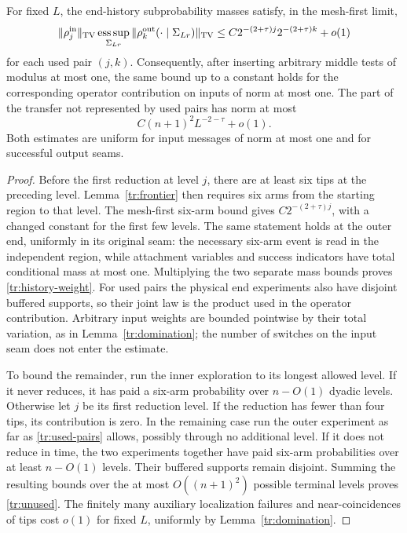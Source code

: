 \begin{lemma}
\label{tr:tails}
For fixed $L$, the end-history subprobability masses satisfy, in the
mesh-first limit,
\begin{equation}
 \|\rho_j^{\rm in}\|_{\mathrm{TV}}
 \operatorname*{ess\,sup}_{\Sigma_{Lr}}
         \|\rho_k^{\rm out}(\cdot\mid\Sigma_{Lr})\|_{\mathrm{TV}}
      \le C 2^{-(2+\tau)j}2^{-(2+\tau)k}+o(1)
\label{tr:history-weight}
\end{equation}
for each used pair $(j,k)$.  Consequently, after inserting arbitrary
middle tests of modulus at most one, the same bound up to a constant holds
for the corresponding operator contribution on inputs of norm at most
one.  The part of the transfer not represented
by used pairs has norm at most
\begin{equation}
             C(n+1)^2L^{-2-\tau}+o(1).
\label{tr:unused}
\end{equation}
Both estimates are uniform for input messages of norm at most one and
for successful output seams.
\end{lemma}

\begin{proof}
Before the first reduction at level $j$, there are at least six tips
at the preceding level.  Lemma~\ref{tr:frontier} then requires six arms
from the starting region to that level.  The mesh-first six-arm bound
gives $C2^{-(2+\tau)j}$, with a changed constant for the first few
levels.  The same statement holds at the outer end, uniformly in its
original seam: the necessary six-arm event is read in the independent
region, while attachment variables and success indicators have total
conditional mass at most one.  Multiplying the two separate mass
bounds proves \eqref{tr:history-weight}.  For used pairs the physical
end experiments also have disjoint buffered supports, so their joint
law is the product used in the operator contribution.  Arbitrary input
weights are bounded
pointwise by their total variation, as in
Lemma~\ref{tr:domination}; the number of switches on the input seam
does not enter the estimate.

To bound the remainder, run the inner exploration to its longest
allowed level.  If it never reduces, it has paid a six-arm probability
over $n-O(1)$ dyadic levels.  Otherwise let $j$ be its first reduction
level.  If the reduction has fewer than four tips, its contribution
is zero.  In the remaining case run the outer experiment as far as
\eqref{tr:used-pairs} allows, possibly through no additional level.
If it does not reduce in time, the two experiments together have
paid six-arm probabilities over at least $n-O(1)$ levels.  Their
buffered supports remain disjoint.  Summing the resulting bounds over
the at most $O((n+1)^2)$ possible terminal levels proves
\eqref{tr:unused}.  The finitely many auxiliary localization failures
and near-coincidences of tips cost $o(1)$ for fixed $L$, uniformly by
Lemma~\ref{tr:domination}.
\end{proof}

